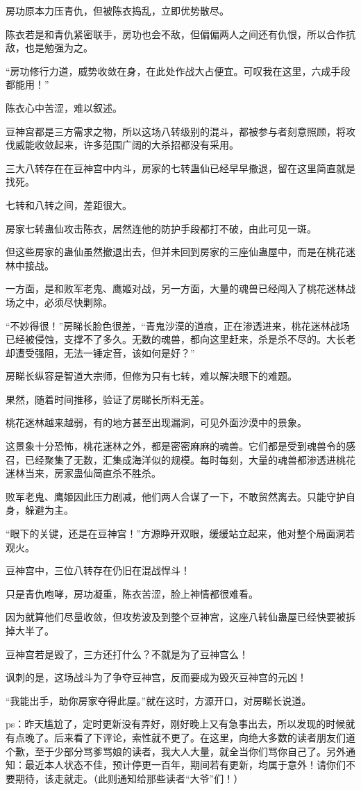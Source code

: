 \begin{this_body}
房功原本力压青仇，但被陈衣捣乱，立即优势散尽。

陈衣若是和青仇紧密联手，房功也会不敌，但偏偏两人之间还有仇恨，所以合作抗敌，也是勉强为之。

“房功修行力道，威势收敛在身，在此处作战大占便宜。可叹我在这里，六成手段都能用！”

陈衣心中苦涩，难以叙述。

豆神宫都是三方需求之物，所以这场八转级别的混斗，都被参与者刻意照顾，将攻伐威能收敛起来，许多范围广阔的大杀招都没有采用。

三大八转存在在豆神宫中内斗，房家的七转蛊仙已经早早撤退，留在这里简直就是找死。

七转和八转之间，差距很大。

房家七转蛊仙攻击陈衣，居然连他的防护手段都打不破，由此可见一斑。

但这些房家的蛊仙虽然撤退出去，但并未回到房家的三座仙蛊屋中，而是在桃花迷林中接战。

一方面，是和败军老鬼、鹰姬对战，另一方面，大量的魂兽已经闯入了桃花迷林战场之中，必须尽快剿除。

“不妙得很！”房睇长脸色很差，“青鬼沙漠的道痕，正在渗透进来，桃花迷林战场已经被侵蚀，支撑不了多久。无数的魂兽，都向这里赶来，杀是杀不尽的。大长老却遭受强阻，无法一锤定音，该如何是好？”

房睇长纵容是智道大宗师，但修为只有七转，难以解决眼下的难题。

果然，随着时间推移，验证了房睇长所料无差。

桃花迷林越来越弱，有的地方甚至出现漏洞，可见外面沙漠中的景象。

这景象十分恐怖，桃花迷林之外，都是密密麻麻的魂兽。它们都是受到魂兽令的感召，已经聚集了无数，汇集成海洋似的规模。每时每刻，大量的魂兽都渗透进桃花迷林当来，房家蛊仙简直杀不胜杀。

败军老鬼、鹰姬因此压力剧减，他们两人合谋了一下，不敢贸然离去。只能守护自身，躲避为主。

“眼下的关键，还是在豆神宫！”方源睁开双眼，缓缓站立起来，他对整个局面洞若观火。

豆神宫中，三位八转存在仍旧在混战悍斗！

只是青仇咆哮，房功凝重，陈衣苦涩，脸上神情都很难看。

因为就算他们尽量收敛，但攻势波及到整个豆神宫，这座八转仙蛊屋已经快要被拆掉大半了。

豆神宫若是毁了，三方还打什么？不就是为了豆神宫么！

讽刺的是，这场战斗为了争夺豆神宫，反而要成为毁灭豆神宫的元凶！

“我能出手，助你房家夺得此屋。”就在这时，方源开口，对房睇长说道。

ps：昨天尴尬了，定时更新没有弄好，刚好晚上又有急事出去，所以发现的时候就有点晚了。后来看了下评论，索性就不更了。在这里，向绝大多数的读者朋友们道个歉，至于少部分骂爹骂娘的读者，我大人大量，就全当你们骂你自己了。另外通知：最近本人状态不佳，预计停更一百年，期间若有更新，均属于意外！请你们不要期待，该走就走。（此则通知给那些读者“大爷”们！）

\end{this_body}

